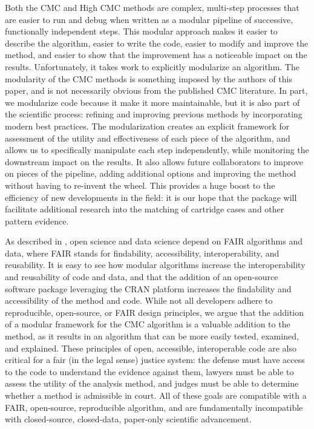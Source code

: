 Both the CMC and High CMC methods are complex, multi-step processes that
are easier to run and debug when written as a modular pipeline of
successive, functionally independent steps. This modular approach makes
it easier to describe the algorithm, easier to write the code, easier to
modify and improve the method, and easier to show that the improvement
has a noticeable impact on the results. Unfortunately, it takes work to
explicitly modularize an algorithm. The modularity of the CMC methods is
something imposed by the authors of this paper, and is not necessarily
obvious from the published CMC literature. In part, we modularize code
because it make it more maintainable, but it is also part of the
scientific process: refining and improving previous methods by
incorporating modern best practices. The modularization creates an
explicit framework for assessment of the utility and effectiveness of
each piece of the algorithm, and allows us to specifically manipulate
each step independently, while monitoring the downstream impact on the
results. It also allows future collaborators to improve on pieces of the
pipeline, adding additional options and improving the method without
having to re-invent the wheel. This provides a huge boost to the
efficiency of new developments in the field: it is our hope that the
 package will facilitate additional research into the
matching of cartridge cases and other pattern evidence.

As described in \citet{wittenburg_open_2021}, open science and data
science depend on FAIR algorithms and data, where FAIR stands for
findability, accessibility, interoperability, and reusability. It is
easy to see how modular algorithms increase the interoperability and
reusability of code and data, and that the addition of an open-source
software package leveraging the CRAN platform increases the findability
and accessibility of the method and code. While not all developers
adhere to reproducible, open-source, or FAIR design principles, we argue
that the addition of a modular framework for the CMC algorithm is a
valuable addition to the method, as it results in an algorithm that can
be more easily tested, examined, and explained. These principles of
open, accessible, interoperable code are also critical for a fair (in
the legal sense) justice system: the defense must have access to the
code to understand the evidence against them, lawyers must be able to
assess the utility of the analysis method, and judges must be able to
determine whether a method is admissible in court. All of these goals
are compatible with a FAIR, open-source, reproducible algorithm, and are
fundamentally incompatible with closed-source, closed-data, paper-only
scientific advancement.

